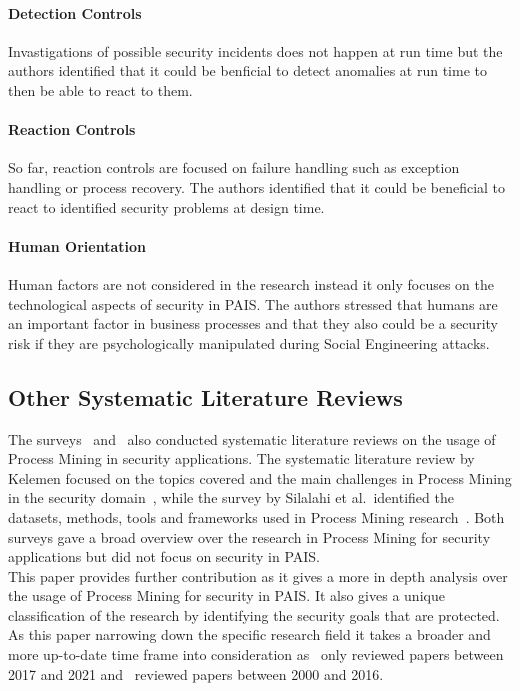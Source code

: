 \documentclass[runningheads]{llncs}
\begin{document}
\paragraph{Detection Controls} Invastigations of possible security incidents does not happen at run time but the authors identified that it could be benficial to detect anomalies
at run time to then be able to react to them.
\paragraph{Reaction Controls} So far, reaction controls are focused on failure handling such as exception handling or process recovery. The authors identified that it could be beneficial
to react to identified security problems at design time.
\paragraph{Human Orientation} Human factors are not considered in the research instead it only focuses on the technological aspects of security in PAIS\@. The authors stressed that
humans are an important factor in business processes and that they also could be a security risk if they are psychologically manipulated during Social Engineering attacks.
\subsection{Other Systematic Literature Reviews}\label{Other}
The surveys~\cite{Kelemen_2018} and~\cite{Silalahi20221} also conducted systematic literature reviews on the usage of Process Mining in security applications. The systematic literature review
by Kelemen focused on the topics covered and the main challenges in Process Mining in the security domain~\cite{Kelemen_2018}, while the survey by Silalahi et al.\ identified the datasets,
methods, tools and frameworks used in Process Mining research~\cite{Silalahi20221}. Both surveys gave a broad overview over the research in Process Mining for security applications but did not
focus on security in PAIS\@.\\
This paper provides further contribution as it gives a more in depth analysis over the usage of Process Mining for security in PAIS\@. It also gives a unique classification of the research by
identifying the security goals that are protected. As this paper narrowing down the specific research field it takes a broader and more up-to-date time frame into consideration as~\cite{Silalahi20221} only reviewed
papers between 2017 and 2021 and~\cite{Kelemen_2018} reviewed papers between 2000 and 2016.
\end{document}
